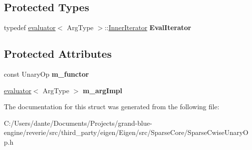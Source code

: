 \subsection*{Protected Types}
\begin{DoxyCompactItemize}
\item 
\mbox{\label{struct_eigen_1_1internal_1_1unary__evaluator_3_01_cwise_unary_op_3_01_unary_op_00_01_arg_type_01_4_00_01_iterator_based_01_4_afb5ffc7a745f2238a62bc495a5b24b94}} 
typedef \mbox{\hyperlink{struct_eigen_1_1internal_1_1evaluator}{evaluator}}$<$ Arg\+Type $>$\+::\mbox{\hyperlink{class_eigen_1_1_inner_iterator}{Inner\+Iterator}} {\bfseries Eval\+Iterator}
\end{DoxyCompactItemize}
\subsection*{Protected Attributes}
\begin{DoxyCompactItemize}
\item 
\mbox{\label{struct_eigen_1_1internal_1_1unary__evaluator_3_01_cwise_unary_op_3_01_unary_op_00_01_arg_type_01_4_00_01_iterator_based_01_4_ae9261a539980cdebdffc18964cbb5d9d}} 
const Unary\+Op {\bfseries m\+\_\+functor}
\item 
\mbox{\label{struct_eigen_1_1internal_1_1unary__evaluator_3_01_cwise_unary_op_3_01_unary_op_00_01_arg_type_01_4_00_01_iterator_based_01_4_a139fe6a41a68e1d5d58a8a3ae6213afd}} 
\mbox{\hyperlink{struct_eigen_1_1internal_1_1evaluator}{evaluator}}$<$ Arg\+Type $>$ {\bfseries m\+\_\+arg\+Impl}
\end{DoxyCompactItemize}


The documentation for this struct was generated from the following file\+:\begin{DoxyCompactItemize}
\item 
C\+:/\+Users/dante/\+Documents/\+Projects/grand-\/blue-\/engine/reverie/src/third\+\_\+party/eigen/\+Eigen/src/\+Sparse\+Core/Sparse\+Cwise\+Unary\+Op.\+h\end{DoxyCompactItemize}

